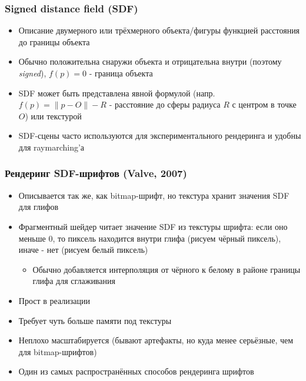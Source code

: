\documentclass{beamer}
\begin{document}
\begin{frame}[fragile]
\frametitle{Signed distance field (SDF)}
\begin{itemize}
\item Описание двумерного или трёхмерного объекта/фигуры функцией расстояния до границы объекта
\pause
\item Обычно положительна снаружи объекта и отрицательна внутри (поэтому \textit{signed}), \begin{math}f(p) = 0\end{math} - граница объекта
\pause
\item SDF может быть представлена явной формулой (напр. \begin{math}f(p) = \|p - O\| - R\end{math} - расстояние до сферы радиуса \begin{math}R\end{math} с центром в точке \begin{math}O\end{math}) или текстурой
\pause
\item SDF-сцены часто используются для экспериментального рендеринга и удобны для raymarching'а
\end{itemize}
\end{frame}

\begin{frame}[fragile]
\frametitle{Рендеринг SDF-шрифтов (Valve, 2007)}
\begin{itemize}
\item Описывается так же, как bitmap-шрифт, но текстура хранит значения SDF для глифов
\pause
\item Фрагментный шейдер читает значение SDF из текстуры шрифта: если оно меньше 0, то пиксель находится внутри глифа (рисуем чёрный пиксель), иначе - нет (рисуем белый пиксель)
\begin{itemize}
\item Обычно добавляется интерполяция от чёрного к белому в районе границы глифа для сглаживания
\end{itemize}
\pause
\item Прост в реализации
\pause
\item Требует чуть больше памяти под текстуры
\pause
\item Неплохо масштабируется (бывают артефакты, но куда менее серьёзные, чем для bitmap-шрифтов)
\pause
\item Один из самых распространённых способов рендеринга шрифтов
\end{itemize}
\end{frame}
\end{document}
